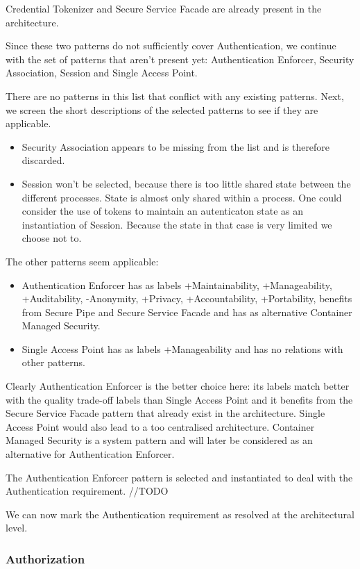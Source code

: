 \documentclass[a4paper,11pt]{report}
\begin{document}
Credential Tokenizer and Secure Service Facade are already present in the architecture.

Since these two patterns do not sufficiently cover Authentication, we continue with the set of patterns that aren't
present yet: Authentication Enforcer, Security Association, Session and Single Access Point.

There are no patterns in this list that conflict with any existing patterns.
Next, we screen the short descriptions of the selected patterns to see if they are applicable. 
\begin{itemize}
\item Security Association appears to be missing from the list and is therefore discarded. 
\item Session won't be selected, because there is too little shared state between the different processes. State is almost only shared within a process. One could consider the use of tokens to maintain an autenticaton state as an instantiation of Session. Because the state in that case is very limited we choose not to.
\end{itemize}

The other patterns seem applicable:
\begin{itemize}
\item Authentication Enforcer has as labels +Maintainability, +Manageability, +Auditability, -Anonymity, +Privacy, 
+Accountability, +Portability, benefits from Secure Pipe and Secure Service Facade and has as alternative
Container Managed Security.
\item Single Access Point has as labels +Manageability and has no relations with other patterns.
\end{itemize}

Clearly Authentication Enforcer is the better choice here: its labels match better with the quality trade-off labels
than Single Access Point and it benefits from the Secure Service Facade pattern that already exist in the architecture. 
Single Access Point would also lead to a too centralised architecture. Container Managed Security is a system pattern and will later be considered as an alternative for Authentication Enforcer.

The Authentication Enforcer pattern is selected and instantiated to deal with the Authentication requirement. //TODO

We can now mark the Authentication requirement as resolved at the architectural level.

\subsubsection{Authorization}
\end{document}
